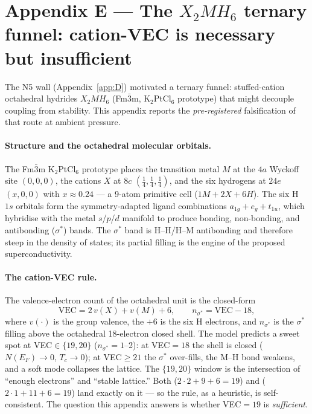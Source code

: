 \section{Appendix E --- The $X_2MH_6$ ternary funnel: cation-VEC is
necessary but insufficient}
\label{app:E}

The N5 wall (Appendix~\ref{app:D}) motivated a ternary funnel: stuffed-cation
octahedral hydrides $X_2MH_6$ (Fm$\bar{3}$m, K$_2$PtCl$_6$ prototype) that
might decouple coupling from stability. This appendix reports the
\emph{pre-registered} falsification of that route at ambient pressure.

\paragraph{Structure and the octahedral molecular orbitals.}
The Fm$\bar{3}$m K$_2$PtCl$_6$ prototype places the transition metal $M$ at
the $4a$ Wyckoff site $(0,0,0)$, the cations $X$ at $8c$
$(\frac14,\frac14,\frac14)$, and the six hydrogens at $24e$ $(x,0,0)$ with
$x\approx0.24$ --- a 9-atom primitive cell ($1M + 2X + 6H$). The six H~$1s$
orbitals form the symmetry-adapted ligand combinations $a_{1g}+e_g+t_{1u}$,
which hybridise with the metal $s$/$p$/$d$ manifold to produce bonding,
non-bonding, and antibonding ($\sigma^\ast$) bands. The $\sigma^\ast$ band is
H--H/H--M antibonding and therefore steep in the density of states; its
partial filling is the engine of the proposed superconductivity.

\paragraph{The cation-VEC rule.}
The valence-electron count of the octahedral unit is the closed-form
\begin{equation}
\mathrm{VEC} = 2\,v(X) + v(M) + 6,
\qquad
n_{\sigma^\ast} = \mathrm{VEC} - 18,
\end{equation}
where $v(\cdot)$ is the group valence, the $+6$ is the six H electrons, and
$n_{\sigma^\ast}$ is the $\sigma^\ast$ filling above the octahedral
18-electron closed shell. The model predicts a sweet spot at
VEC$\in\{19,20\}$ ($n_{\sigma^\ast}=1$--2): at VEC$=18$ the shell is closed
($N(E_F)\to0$, $T_c\to0$); at VEC$\ge21$ the $\sigma^\ast$ over-fills, the
M--H bond weakens, and a soft mode collapses the lattice. The
$\{19,20\}$ window is the intersection of ``enough electrons'' and ``stable
lattice.'' Both  ($2\cdot2+9+6=19$) and 
($2\cdot1+11+6=19$) land exactly on it --- so the rule, as a heuristic, is
self-consistent. The question this appendix answers is whether VEC$=19$ is
\emph{sufficient}.

